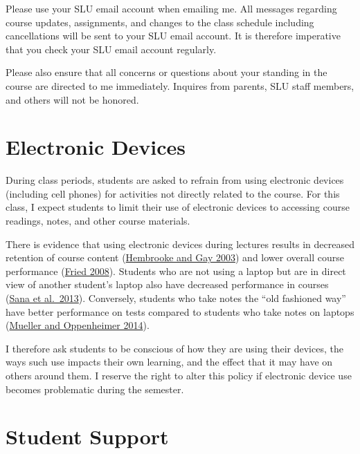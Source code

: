 \documentclass[]{book}
\begin{document}
Please use your SLU email account when emailing me. All messages regarding course updates, assignments, and changes to the class schedule including cancellations will be sent to your SLU email account. It is therefore imperative that you check your SLU email account regularly.

Please also ensure that all concerns or questions about your standing in the course are directed to me immediately. Inquires from parents, SLU staff members, and others will not be honored.

\hypertarget{electronic-devices}{%
\section{Electronic Devices}\label{electronic-devices}}

During class periods, students are asked to refrain from using electronic devices (including cell phones) for activities not directly related to the course. For this class, I expect students to limit their use of electronic devices to accessing course readings, notes, and other course materials.

There is evidence that using electronic devices during lectures results in decreased retention of course content (\href{https://link.springer.com/article/10.1007/BF02940852}{Hembrooke and Gay 2003}) and lower overall course performance (\href{https://www.sciencedirect.com/science/article/pii/S0360131506001436}{Fried 2008}). Students who are not using a laptop but are in direct view of another student's laptop also have decreased performance in courses (\href{https://www.sciencedirect.com/science/article/pii/S0360131512002254}{Sana et al.~2013}). Conversely, students who take notes the ``old fashioned way'' have better performance on tests compared to students who take notes on laptops (\href{http://journals.sagepub.com/doi/abs/10.1177/0956797614524581}{Mueller and Oppenheimer 2014}).

I therefore ask students to be conscious of how they are using their devices, the ways such use impacts their own learning, and the effect that it may have on others around them. I reserve the right to alter this policy if electronic device use becomes problematic during the semester.

\hypertarget{student-support}{%
\section{Student Support}\label{student-support}}
\end{document}
